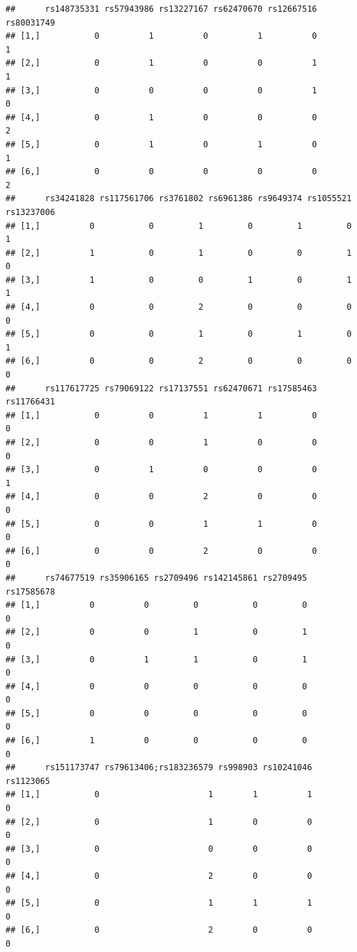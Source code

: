 \documentclass[
]{article}
\begin{document}
\begin{verbatim}
##      rs148735331 rs57943986 rs13227167 rs62470670 rs12667516 rs80031749
## [1,]           0          1          0          1          0          1
## [2,]           0          1          0          0          1          1
## [3,]           0          0          0          0          1          0
## [4,]           0          1          0          0          0          2
## [5,]           0          1          0          1          0          1
## [6,]           0          0          0          0          0          2
##      rs34241828 rs117561706 rs3761802 rs6961386 rs9649374 rs1055521 rs13237006
## [1,]          0           0         1         0         1         0          1
## [2,]          1           0         1         0         0         1          0
## [3,]          1           0         0         1         0         1          1
## [4,]          0           0         2         0         0         0          0
## [5,]          0           0         1         0         1         0          1
## [6,]          0           0         2         0         0         0          0
##      rs117617725 rs79069122 rs17137551 rs62470671 rs17585463 rs11766431
## [1,]           0          0          1          1          0          0
## [2,]           0          0          1          0          0          0
## [3,]           0          1          0          0          0          1
## [4,]           0          0          2          0          0          0
## [5,]           0          0          1          1          0          0
## [6,]           0          0          2          0          0          0
##      rs74677519 rs35906165 rs2709496 rs142145861 rs2709495 rs17585678
## [1,]          0          0         0           0         0          0
## [2,]          0          0         1           0         1          0
## [3,]          0          1         1           0         1          0
## [4,]          0          0         0           0         0          0
## [5,]          0          0         0           0         0          0
## [6,]          1          0         0           0         0          0
##      rs151173747 rs79613406;rs183236579 rs998903 rs10241046 rs1123065
## [1,]           0                      1        1          1         0
## [2,]           0                      1        0          0         0
## [3,]           0                      0        0          0         0
## [4,]           0                      2        0          0         0
## [5,]           0                      1        1          1         0
## [6,]           0                      2        0          0         0

\end{verbatim}
\end{document}
